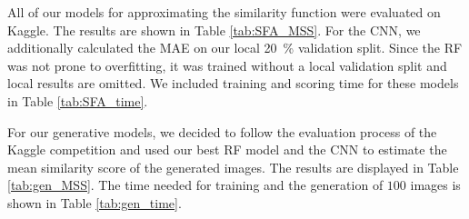 \documentclass[10pt,conference,compsocconf]{IEEEtran}
\begin{document}
All of our models for approximating the similarity function were evaluated on Kaggle. The results are shown in Table \ref{tab:SFA_MSS}.
For the CNN, we additionally calculated the MAE on our local \SI{20}{\percent} validation split. Since the RF was not prone to overfitting, it was trained without a local validation split and local results are omitted. We included training and scoring time for these models in Table \ref{tab:SFA_time}. 




For our generative models, we decided to follow the evaluation process of the Kaggle competition and used our best RF model and the CNN to estimate the mean similarity score of the generated images. The results are displayed in Table \ref{tab:gen_MSS}. The time needed for training and the generation of $100$ images is shown in Table \ref{tab:gen_time}. 
\end{document}
